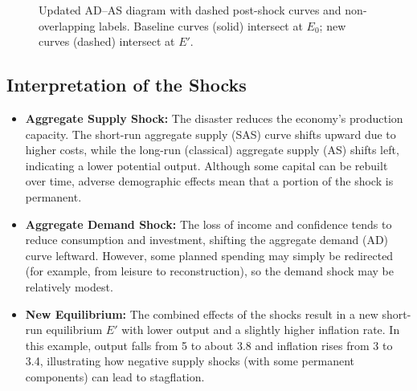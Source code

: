 \begin{figure}[ht]
    \centering
    \caption{Updated AD--AS diagram with dashed post-shock curves and non-overlapping labels. 
    Baseline curves (solid) intersect at \(E_0\); new curves (dashed) intersect at \(E'\).}
\end{figure}

\subsection*{Interpretation of the Shocks}
\begin{itemize}
    \item \textbf{Aggregate Supply Shock:}  
    The disaster reduces the economy’s production capacity. The short-run aggregate supply (SAS) curve shifts upward due to higher costs, while the long-run (classical) aggregate supply (AS) shifts left, indicating a lower potential output. Although some capital can be rebuilt over time, adverse demographic effects mean that a portion of the shock is permanent.
    \item \textbf{Aggregate Demand Shock:}  
    The loss of income and confidence tends to reduce consumption and investment, shifting the aggregate demand (AD) curve leftward. However, some planned spending may simply be redirected (for example, from leisure to reconstruction), so the demand shock may be relatively modest.
    \item \textbf{New Equilibrium:}  
    The combined effects of the shocks result in a new short-run equilibrium \(E'\) with lower output and a slightly higher inflation rate. In this example, output falls from 5 to about 3.8 and inflation rises from 3 to 3.4, illustrating how negative supply shocks (with some permanent components) can lead to stagflation.
\end{itemize}